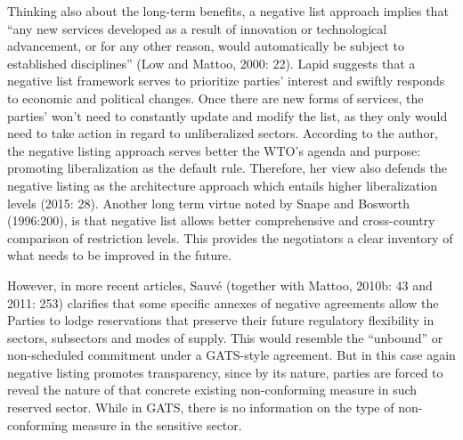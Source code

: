 \documentclass{article}
\begin{document}
Thinking also about the long-term benefits, a negative list approach implies that “any new services developed as a result of innovation or technological advancement, or for any other reason, would automatically be subject to established disciplines” (Low and Mattoo, 2000: 22). Lapid suggests that a negative list framework serves to prioritize parties’ interest and swiftly responds to economic and political changes. Once there are new forms of services, the parties’ won’t need to constantly update and modify the list, as they only would need to take action in regard to unliberalized sectors. According to the author, the negative listing approach serves better the WTO’s agenda and purpose: promoting liberalization as the default rule. Therefore, her view also defends the negative listing as the architecture approach which entails higher liberalization levels (2015: 28). Another long term virtue noted by Snape and Bosworth (1996:200), is that negative list allows better comprehensive and cross-country comparison of restriction levels. This provides the negotiators a clear inventory of what needs to be improved in the future.

\smallskip

However, in more recent articles, Sauvé (together with Mattoo, 2010b: 43 and 2011: 253) clarifies that some specific annexes of negative agreements allow the Parties to lodge reservations that preserve their future regulatory flexibility in sectors, subsectors and modes of supply. This would resemble the “unbound” or non-scheduled commitment under a GATS-style agreement. But in this case again negative listing promotes transparency, since by its nature, parties are forced to reveal the nature of that concrete existing non-conforming measure in such reserved sector. While in GATS, there is no information on the type of non-conforming measure in the sensitive sector.

\smallskip
\end{document}
